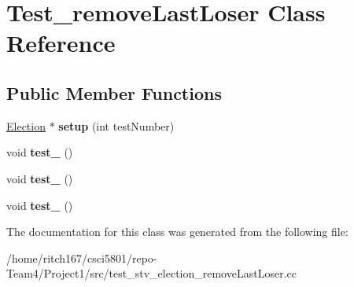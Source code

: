 \hypertarget{classTest__removeLastLoser}{}\section{Test\+\_\+remove\+Last\+Loser Class Reference}
\label{classTest__removeLastLoser}
\subsection*{Public Member Functions}
\begin{DoxyCompactItemize}
\item 
\mbox{\label{classTest__removeLastLoser_ae2dc52db353ba66c0b60a57d101c1884}} 
\hyperlink{classElection}{Election} $\ast$ {\bfseries setup} (int test\+Number)
\item 
\mbox{\label{classTest__removeLastLoser_a6b6959b027443aa59b8aebdb6b308925}} 
void {\bfseries test\+\_} ()
\item 
\mbox{\label{classTest__removeLastLoser_a09c34b1b95bdd52e5a8ff76cce6767c9}} 
void {\bfseries test\+\_} ()
\item 
\mbox{\label{classTest__removeLastLoser_a40dbf4b423752632fdc575f6dd52ec75}} 
void {\bfseries test\+\_} ()
\end{DoxyCompactItemize}


The documentation for this class was generated from the following file\+:\begin{DoxyCompactItemize}
\item 
/home/ritch167/csci5801/repo-\/\+Team4/\+Project1/src/test\+\_\+stv\+\_\+election\+\_\+remove\+Last\+Loser.\+cc\end{DoxyCompactItemize}
